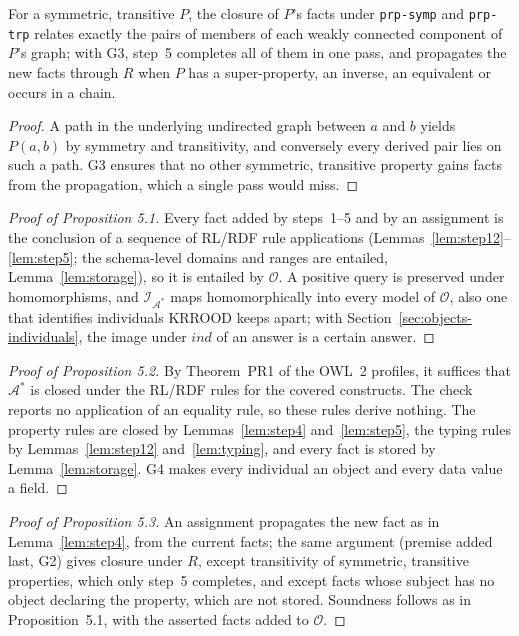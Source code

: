 \begin{lemma}[Step 5]
\label{lem:step5}
For a symmetric, transitive $P$, the closure of $P$'s facts under \texttt{prp-symp} and
\texttt{prp-trp} relates exactly the pairs of members of each weakly connected component of $P$'s
graph; with G3, step~5 completes all of them in one pass, and propagates the new facts through
$R$ when $P$ has a super-property, an inverse, an equivalent or occurs in a chain.
\end{lemma}

\begin{proof}
A path in the underlying undirected graph between $a$ and $b$ yields $P(a,b)$ by symmetry and
transitivity, and conversely every derived pair lies on such a path. G3 ensures that no other
symmetric, transitive property gains facts from the propagation, which a single pass would miss.
\end{proof}

\begin{proof}[Proof of Proposition 5.1]
Every fact added by steps~1--5 and by an assignment is the conclusion of a sequence of RL/RDF
rule applications (Lemmas~\ref{lem:step12}--\ref{lem:step5}; the schema-level domains and ranges
are entailed, Lemma~\ref{lem:storage}), so it is entailed by $\mathcal{O}$. A positive query is
preserved under homomorphisms, and $\mathcal{I}_{\mathcal{A}^*}$ maps homomorphically into every
model of $\mathcal{O}$, also one that identifies individuals KRROOD keeps apart; with
Section~\ref{sec:objects-individuals}, the image under $\mathit{ind}$ of an answer is a certain
answer.
\end{proof}

\begin{proof}[Proof of Proposition 5.2]
By Theorem~PR1 of the OWL~2 profiles, it suffices that $\mathcal{A}^*$ is closed under the
RL/RDF rules for the covered constructs. The check reports no application of an equality rule,
so these rules derive nothing. The property rules are closed by Lemmas~\ref{lem:step4}
and~\ref{lem:step5}, the typing rules by Lemmas~\ref{lem:step12} and~\ref{lem:typing}, and every
fact is stored by Lemma~\ref{lem:storage}. G4 makes every individual an object and every data
value a field.
\end{proof}

\begin{proof}[Proof of Proposition 5.3]
An assignment propagates the new fact as in Lemma~\ref{lem:step4}, from the current facts; the
same argument (premise added last, G2) gives closure under $R$, except transitivity of
symmetric, transitive properties, which only step~5 completes, and except facts whose subject has
no object declaring the property, which are not stored. Soundness follows as in
Proposition~5.1, with the asserted facts added to $\mathcal{O}$.
\end{proof}

